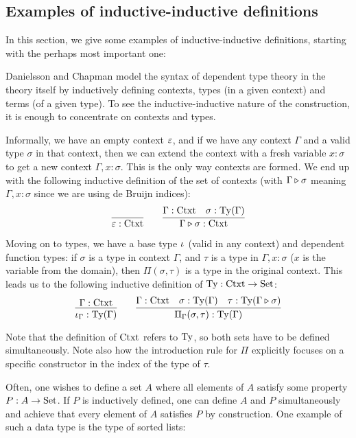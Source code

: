\documentclass{article}
\begin{document}
\subsection{Examples of inductive-inductive definitions}
\label{sec:examples}

In this section, we give some examples of inductive-inductive
definitions, starting with the perhaps most important one:

\begin{example}
\label{ex:ctxt-type}

Danielsson \cite{danielsson2007formalisation} and Chapman
\cite{chapman2009eatitself} model the syntax of dependent type theory
in the theory itself by inductively defining contexts, types (in a
given context) and terms (of a given type). To see the
inductive-inductive nature of the construction, it is enough to
concentrate on contexts and types.

Informally, we have an empty context $\varepsilon$, and if we have any
context $\Gamma$ and a valid type $\sigma$ in that context, then we
can extend the context with a fresh variable $x : \sigma$ to get a new
context $\Gamma, x : \sigma$. This is the only way contexts are
formed. We end up with the following inductive definition of the set
of contexts (with $\Gamma \triangleright \sigma$ meaning $\Gamma, x :
\sigma$ since we are using de Bruijn indices):
\[
\infer{\emptyCtxt : \Ctxt}{} \qquad
\infer{\consCtxt{\Gamma}{\sigma} : \Ctxt}{\Gamma : \Ctxt & \sigma : \Ty(\Gamma)}
\]

Moving on to types, we have a base type $\iota_{}$ (valid in any
context) and dependent function types: if $\sigma$ is a type in
context $\Gamma$, and $\tau$ is a type in $\Gamma, x : \sigma$ ($x$ is
the variable from the domain), then $\Pi(\sigma, \tau)$ is a type in
the original context. This leads us to the following inductive
definition of $\text{Ty} : \text{Ctxt} \to \text{Set}$:
\[
\infer{\baseTy{\Gamma} : \Ty(\Gamma)}{\Gamma : \Ctxt} \qquad
\infer{\piTy{\Gamma}{\sigma}{\tau} : \Ty(\Gamma)}{\Gamma : \Ctxt
                    & \sigma : \Ty(\Gamma)
                    & \tau : \Ty(\consCtxt{\Gamma}{\sigma})}
\]

Note that the definition of $\text{Ctxt}$ refers to $\text{Ty}$, so both sets have
to be defined simultaneously. Note also how the introduction rule for
$\Pi$ explicitly focuses on a specific constructor in the index of the
type of $\tau$. 
\blackqed
\end{example}

Often, one wishes to define a set $A$ where all elements of $A$
satisfy some property $P : A \to \text{Set}$. If $P$ is inductively defined,
one can define $A$ and $P$ simultaneously and achieve that every
element of $A$ satisfies $P$ by construction. One example of such a
data type is the type of sorted lists:
\end{document}
